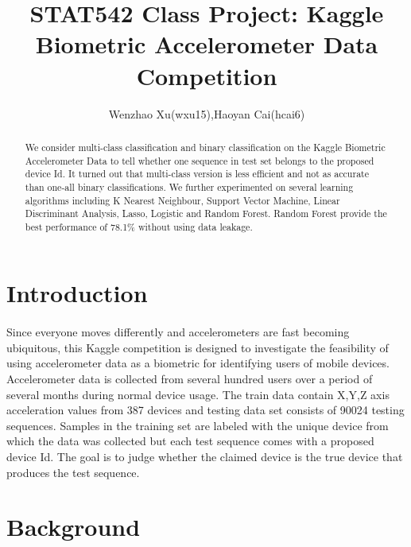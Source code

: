 \documentclass[11pt,letterpaper]{article}
\begin{document}
\title{STAT542 Class Project: Kaggle Biometric Accelerometer Data Competition}
\author{Wenzhao Xu(wxu15),Haoyan Cai(hcai6)}
\maketitle





\begin{abstract}
We consider multi-class classification and binary classification on the Kaggle Biometric Accelerometer Data to tell whether one sequence in test set belongs to the proposed device Id. It turned out that multi-class version is less efficient and not as accurate than one-all binary classifications. We further experimented on several learning algorithms including K Nearest Neighbour, Support Vector Machine, Linear Discriminant Analysis, Lasso, Logistic and Random Forest. Random Forest provide the best performance of 78.1\% without using data leakage.

\end{abstract}


\section{Introduction} 
\label{sec:introduction}
\paragraph{} Since everyone moves differently and accelerometers are fast becoming ubiquitous, this Kaggle competition is designed to investigate the feasibility of using accelerometer data as a biometric for identifying users of mobile devices. Accelerometer data is collected from several hundred users over a period of several months during normal device usage. 
 The train data contain X,Y,Z axis acceleration values from 387 devices and testing data set consists of 90024 testing sequences. Samples in the training set are labeled with the unique device from which the data was collected but each test sequence comes with a proposed device Id. The goal is to judge whether the claimed device is the true device that produces the test sequence. 
	
 

\section{Background}
\label{sec:background}
\end{document}
